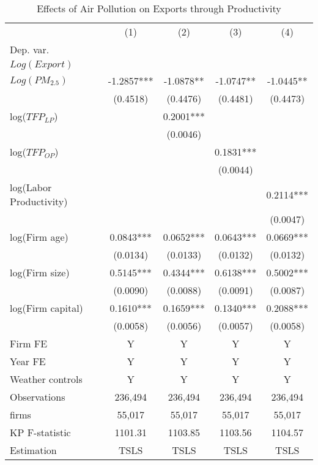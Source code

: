 \documentclass[12pt]{article}
\begin{document}
  \begin{table}[H]\centering
  \addtocounter{table}{-1}
  \renewcommand{\thetable}{\arabic{table}b}
      \caption{Effects of Air Pollution on Exports through Productivity} \label{tab:mechan_tfp2}
      \begin{tabular}{l*{4}{c}}
        \hline\hline
        &\multicolumn{1}{c}{(1)}&\multicolumn{1}{c}{(2)}&\multicolumn{1}{c}{(3)}&\multicolumn{1}{c}{(4)}\\
        Dep. var. &&&&\\
        $Log(Export)$ &&&&\\
        \hline
        $Log(PM_{2.5})$  & -1.2857*** & -1.0878** &-1.0747** & -1.0445**\\
                          &(0.4518)  &(0.4476)&(0.4481) & (0.4473)\\	
        log($TFP_{LP}$)     &&0.2001***&   &\\
                            &&(0.0046)&&\\
        log($TFP_{OP}$)     &&&0.1831***&\\
                            &&&(0.0044)&\\   
        log(Labor Productivity) &&&&0.2114***\\
                            &&&&(0.0047)\\
        log(Firm age)       &0.0843***&0.0652***&0.0643***&0.0669***\\
                            &(0.0134) &(0.0133)&(0.0132)&(0.0132)\\
        log(Firm size)      &0.5145***&0.4344***&0.6138***&0.5002***\\
                            &(0.0090) &(0.0088)&(0.0091)&(0.0087)\\
        log(Firm capital)   &0.1610***&0.1659***&0.1340***&0.2088***\\         
                            &(0.0058) &(0.0056)&(0.0057)&(0.0058)\\  
        \hline
        Firm FE &Y&Y&Y&Y\\
        Year FE &Y&Y&Y&Y\\
        Weather controls &Y&Y&Y&Y\\
        \hline
        Observations    &236,494&236,494&236,494&236,494\\
        firms           &55,017&55,017&55,017&55,017\\
        KP F-statistic  &1101.31&1103.85&1103.56&1104.57\\
        Estimation      &TSLS&TSLS&TSLS&TSLS\\

\end{tabular}
\end{table}
\end{document}
